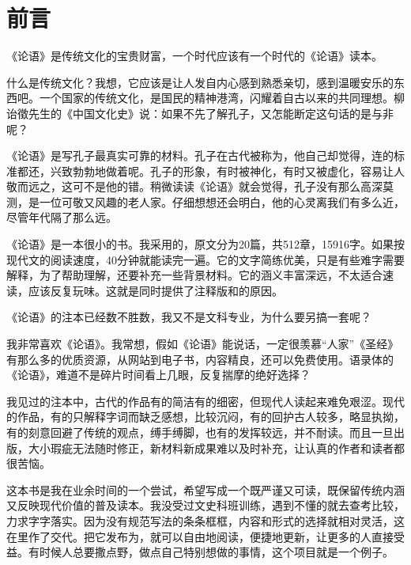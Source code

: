 \chapter*{前\qquad 言}

《论语》是传统文化的宝贵财富，一个时代应该有一个时代的《论语》读本。

什么是传统文化？我想，它应该是让人发自内心感到熟悉亲切，感到温暖安乐的东西吧。一个国家的传统文化，是国民的精神港湾，闪耀着自古以来的共同理想。柳诒徵先生的《中国文化史》说：如果不先了解孔子，又怎能断定这句话的是与非呢？

《论语》是写孔子最真实可靠的材料。孔子在古代被称为，他自己却觉得，连的标准都还，兴致勃勃地做着呢。孔子的形象，有时被神化，有时又被虚化，容易让人敬而远之，这可不是他的错。稍微读读《论语》就会觉得，孔子没有那么高深莫测，是一位可敬又风趣的老人家。仔细想想还会明白，他的心灵离我们有多么近，尽管年代隔了那么远。

《论语》是一本很小的书。我采用的，原文分为20篇，共512章，15916字。如果按现代文的阅读速度，40分钟就能读完一遍。它的文字简练优美，只是有些难字需要解释，为了帮助理解，还要补充一些背景材料。它的涵义丰富深远，不太适合速读，应该反复玩味。这就是同时提供了注释版和的原因。

《论语》的注本已经数不胜数，我又不是文科专业，为什么要另搞一套呢？

我非常喜欢《论语》。我常想，假如《论语》能说话，一定很羡慕“人家”《圣经》有那么多的优质资源，从网站到电子书，内容精良，还可以免费使用。语录体的《论语》，难道不是碎片时间看上几眼，反复揣摩的绝好选择？

我见过的注本中，古代的作品有的简洁有的细密，但现代人读起来难免艰涩。现代的作品，有的只解释字词而缺乏感想，比较沉闷，有的回护古人较多，略显执拗，有的刻意回避了传统的观点，缚手缚脚，也有的发挥较远，并不耐读。而且一旦出版，大小瑕疵无法随时修正，新材料新成果难以及时补充，让认真的作者和读者都很苦恼。

这本书是我在业余时间的一个尝试，希望写成一个既严谨又可读，既保留传统内涵又反映现代价值的普及读本。我没受过文史科班训练，遇到不懂的就去查考比较，力求字字落实。因为没有规范写法的条条框框，内容和形式的选择就相对灵活，这在里作了交代。把它发布为，就可以自由地阅读，便捷地更新，让更多的人直接受益。有时候人总要撒点野，做点自己特别想做的事情，这个项目就是一个例子。

